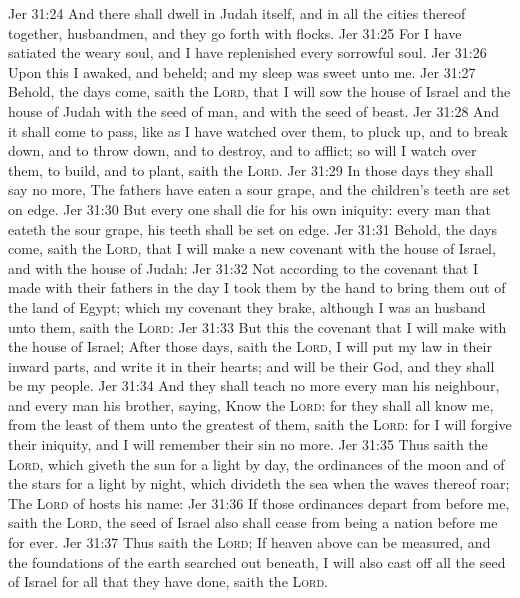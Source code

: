 \vs Jer 31:24 And there shall dwell in Judah itself, and in all the cities thereof together, husbandmen, and they  go forth with flocks.
\vs Jer 31:25 For I have satiated the weary soul, and I have replenished every sorrowful soul.
\vs Jer 31:26 Upon this I awaked, and beheld; and my sleep was sweet unto me.
\vs Jer 31:27 Behold, the days come, saith the \textsc{Lord}, that I will sow the house of Israel and the house of Judah with the seed of man, and with the seed of beast.
\vs Jer 31:28 And it shall come to pass,  like as I have watched over them, to pluck up, and to break down, and to throw down, and to destroy, and to afflict; so will I watch over them, to build, and to plant, saith the \textsc{Lord}.
\vs Jer 31:29 In those days they shall say no more, The fathers have eaten a sour grape, and the children's teeth are set on edge.
\vs Jer 31:30 But every one shall die for his own iniquity: every man that eateth the sour grape, his teeth shall be set on edge.
\vs Jer 31:31 Behold, the days come, saith the \textsc{Lord}, that I will make a new covenant with the house of Israel, and with the house of Judah:
\vs Jer 31:32 Not according to the covenant that I made with their fathers in the day  I took them by the hand to bring them out of the land of Egypt; which my covenant they brake, although I was an husband unto them, saith the \textsc{Lord}:
\vs Jer 31:33 But this  the covenant that I will make with the house of Israel; After those days, saith the \textsc{Lord}, I will put my law in their inward parts, and write it in their hearts; and will be their God, and they shall be my people.
\vs Jer 31:34 And they shall teach no more every man his neighbour, and every man his brother, saying, Know the \textsc{Lord}: for they shall all know me, from the least of them unto the greatest of them, saith the \textsc{Lord}: for I will forgive their iniquity, and I will remember their sin no more.
\vs Jer 31:35 Thus saith the \textsc{Lord}, which giveth the sun for a light by day,  the ordinances of the moon and of the stars for a light by night, which divideth the sea when the waves thereof roar; The \textsc{Lord} of hosts  his name:
\vs Jer 31:36 If those ordinances depart from before me, saith the \textsc{Lord},  the seed of Israel also shall cease from being a nation before me for ever.
\vs Jer 31:37 Thus saith the \textsc{Lord}; If heaven above can be measured, and the foundations of the earth searched out beneath, I will also cast off all the seed of Israel for all that they have done, saith the \textsc{Lord}.

